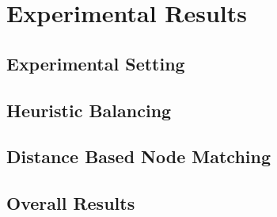 \chapter{Experimental Results} \label{chap:expRes}

\section{Experimental Setting} \label{sec:expRes-setting}

\section{Heuristic Balancing} \label{sec:expRes-heuristic}

\section{Distance Based Node Matching} \label{sec:expRes-distNodeMatch}

\section{Overall Results} \label{sec:expRes-overall}